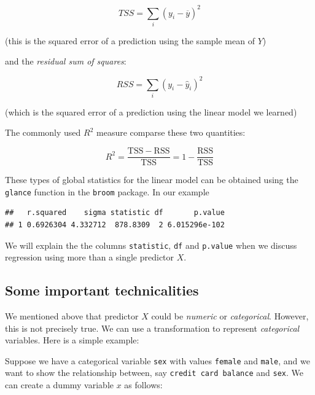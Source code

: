 \documentclass[]{article}
\newenvironment{Shaded}{\begin{snugshade}}{\end{snugshade}}
\newcommand{\KeywordTok}[1]{\textcolor[rgb]{0.13,0.29,0.53}{\textbf{{#1}}}}
\newcommand{\StringTok}[1]{\textcolor[rgb]{0.31,0.60,0.02}{{#1}}}
\newcommand{\NormalTok}[1]{{#1}}
\theoremstyle{definition}
\theoremstyle{definition}
\theoremstyle{remark}
\begin{document}
\[
TSS = \sum_i (y_i - \overline{y})^2
\]

(this is the squared error of a prediction using the sample mean of
\(Y\))

and the \emph{residual sum of squares}:

\[
RSS = \sum_i (y_i - \hat{y}_i)^2
\]

(which is the squared error of a prediction using the linear model we
learned)

The commonly used \(R^2\) measure comparse these two quantities:

\[
R^2 = \frac{\mathrm{TSS}-\mathrm{RSS}}{\mathrm{TSS}} = 1 - \frac{\mathrm{RSS}}{\mathrm{TSS}}
\]

These types of global statistics for the linear model can be obtained
using the \texttt{glance} function in the \texttt{broom} package. In our
example

\begin{Shaded}
\end{Shaded}

\begin{verbatim}
##   r.squared    sigma statistic df       p.value
## 1 0.6926304 4.332712  878.8309  2 6.015296e-102
\end{verbatim}

We will explain the the columns \texttt{statistic}, \texttt{df} and
\texttt{p.value} when we discuss regression using more than a single
predictor \(X\).

\subsection{Some important
technicalities}\label{some-important-technicalities}

We mentioned above that predictor \(X\) could be \emph{numeric} or
\emph{categorical}. However, this is not precisely true. We can use a
transformation to represent \emph{categorical} variables. Here is a
simple example:

Suppose we have a categorical variable \texttt{sex} with values
\texttt{female} and \texttt{male}, and we want to show the relationship
between, say \texttt{credit\ card\ balance} and \texttt{sex}. We can
create a dummy variable \(x\) as follows:
\end{document}
